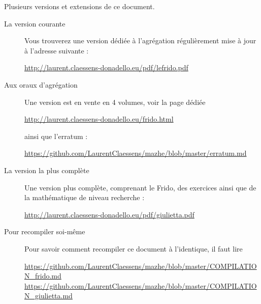 
\thispagestyle{empty}

Plusieurs versions et extensions de ce document.
\begin{description}

    \item[La version courante]

        Vous trouverez une version dédiée à l'agrégation régulièrement mise à jour à l'adresse suivante :
        \begin{center}
            \url{http://laurent.claessens-donadello.eu/pdf/lefrido.pdf}
        \end{center}

    \item[Aux oraux d'agrégation]

        Une version est en vente en 4 volumes, voir la page dédiée
        \begin{center}
            \url{http://laurent.claessens-donadello.eu/frido.html}
        \end{center}
        ainsi que l'erratum :
        \begin{center}
            \url{https://github.com/LaurentClaessens/mazhe/blob/master/erratum.md}
        \end{center}

    \item[La version la plus complète]

        Une version plus complète, comprenant le Frido, des exercices ainsi que de la mathématique de niveau recherche :
        \begin{center}
            \url{http://laurent.claessens-donadello.eu/pdf/giulietta.pdf}
        \end{center}

    \item[Pour recompiler soi-même]
        Pour savoir comment recompiler ce document à l'identique, il faut lire
        \begin{center}
            \url{https://github.com/LaurentClaessens/mazhe/blob/master/COMPILATION_frido.md}
            \url{https://github.com/LaurentClaessens/mazhe/blob/master/COMPILATION_giulietta.md}
        \end{center}

\end{description}
